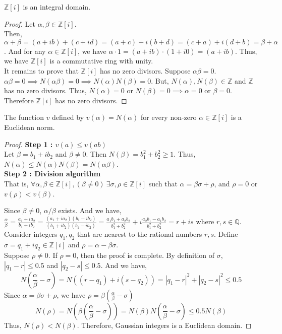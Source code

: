 \begin{lemma}
	$\mathbb{Z}[i]$ is an integral domain.
\end{lemma}
\begin{proof}
	Let $\alpha, \beta \in \mathbb{Z}[i]$.\\
	Then, $\alpha + \beta = (a+ib) + (c+id) = (a+c) + i(b+d) = (c+a) + i(d+b) = \beta + \alpha$.
	And for any $\alpha \in \mathbb{Z}[i]$, we have $\alpha \cdot 1 = (a+ib) \cdot (1+i0) = (a+ib)$.
	Thus, we have $\mathbb{Z}[i]$ is a commutative ring with unity.\\

	It remains to prove that $\mathbb{Z}[i]$ has no zero divisors.
	Suppose $\alpha\beta = 0$.
	$\alpha\beta = 0 \implies N(\alpha\beta) = 0 \implies N(\alpha) N(\beta) = 0$.
	But, $N(\alpha),N(\beta) \in \mathbb{Z}$ and $\mathbb{Z}$ has no zero divisors.
	Thus, $N(\alpha) = 0$ or $N(\beta) = 0 \implies \alpha = 0$ or $\beta = 0$.
	Therefore $\mathbb{Z}[i]$ has no zero divisors.
\end{proof}

\begin{theorem}
	The function $v$ defined by $v(\alpha) = N(\alpha)$ for every non-zero $\alpha \in \mathbb{Z}[i]$ is a Euclidean norm.
\end{theorem}
\begin{proof}
	\textbf{Step 1 : $v(a) \le v(ab)$}\\
	Let $\beta = b_1 + ib_2$ and $\beta \ne 0$.
	Then $N(\beta) = b_1^2+b_2^2 \ge 1$.
	Thus, $N(\alpha) \le N(\alpha)N(\beta) = N(\alpha\beta)$.\\

	\textbf{Step 2 : Division algorithm}\\
	That is, $\forall \alpha,\beta \in \mathbb{Z}[i],(\beta \ne 0)\ \exists \sigma,\rho \in \mathbb{Z}[i]$ such that $\alpha = \beta\sigma+\rho$, and $\rho = 0$ or $v(\rho) < v(\beta)$.

	Since $\beta \ne 0$, $\alpha/\beta$ exists.
	And we have, $\frac{\alpha}{\beta} = \frac{a_1+ia_2}{b_1+ib_2} = \frac{(a_1+ia_2)(b_1-ib_2)}{(b_1+ib_2)(b_1-ib_2)} = \frac{a_1b_1+a_2b_2}{b_1^2+b_2^2} + i \frac{a_2b_1-a_1b_2}{b_1^2+b_2^2} = r+is$ where $r,s \in \mathbb{Q}$.
	Consider integers $q_1,q_2$ that are nearest to the rational numbers $r,s$.
	Define $\sigma = q_1 + iq_2 \in \mathbb{Z}[i]$ and $\rho = \alpha - \beta\sigma$.\\

	Suppose $\rho \ne 0$.
	If $\rho = 0$, then the proof is complete.
	By definition of $\sigma$, $|q_1-r| \le 0.5$ and $|q_2-s| \le 0.5$.
	And we have, $$N \left(\frac{\alpha}{\beta} - \sigma \right) = N((r-q_1)+i(s-q_2)) = |q_1-r|^2 + |q_2-s|^2 \le 0.5$$
	Since $\alpha = \beta\sigma + \rho$,
	we have $\rho = \beta(\frac{\alpha}{\beta}-\sigma)$
	$$N(\rho) = N \left( \beta \left(\frac{\alpha}{\beta}-\sigma \right) \right) = N(\beta) N \left(\frac{\alpha}{\beta}-\sigma\right) \le 0.5N(\beta)$$
	Thus, $N(\rho) < N(\beta)$.
	Therefore, Gaussian integers is a Euclidean domain.
\end{proof}

